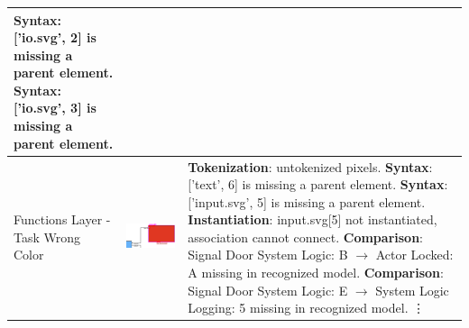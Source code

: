 \begin{longtable}{p{} >{\raggedright\arraybackslash}m{} >{\raggedright\arraybackslash}m{}}
        \textbf{Syntax}: ['io.svg', 2] is missing a parent element. \newline
        \textbf{Syntax}: ['io.svg', 3] is missing a parent element. \\
    \midrule
    Functions Layer - Task Wrong Color &  \includegraphics[width=1\linewidth]{pictures/31_wrong_color_task_output_clip.png} & \textbf{Tokenization}: untokenized pixels. \newline
        \textbf{Syntax}: ['text', 6] is missing a parent element. \newline
        \textbf{Syntax}: ['input.svg', 5] is missing a parent element. \newline
        \textbf{Instantiation}: input.svg[5] not instantiated, association cannot connect. \newline
        \textbf{Comparison}: Signal Door System Logic: B $\rightarrow$ Actor Locked: A missing in recognized model. \newline
        \textbf{Comparison}: Signal Door System Logic: E $\rightarrow$ System Logic Logging: 5 missing in recognized model. \newline
        \vdots \\
    \midrule

\end{longtable}
